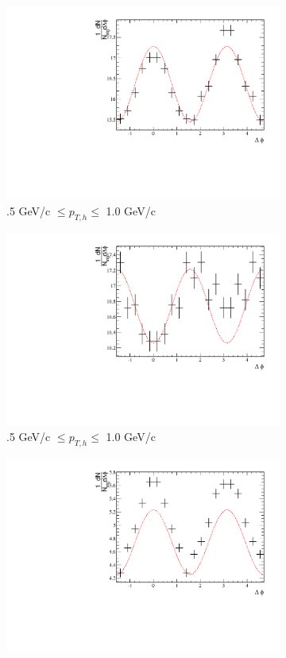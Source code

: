 \begin{figure}[htbp]
	\begin{subfigure}{0.5\textwidth}
		\includegraphics[width=.9\textwidth]{Plots/Correlations/EP/raw/NPE_eh_corr_raw_inplane_primpt_4_5_cent_2_5_assopt_1_1.pdf}
		\caption{.5 GeV/c $\leq p_{T,h} \leq$ 1.0 GeV/c}
		\label{fig:EP_corr_raw_a}
	\end{subfigure}	
	\begin{subfigure}{0.5\textwidth}
		\includegraphics[width=.9\textwidth]{Plots/Correlations/EP/raw/NPE_eh_corr_raw_outofplane_primpt_4_5_cent_2_5_assopt_1_1.pdf}
		\caption{.5 GeV/c $\leq p_{T,h} \leq$ 1.0 GeV/c}
		\label{fig:EP_corr_raw_b}
	\end{subfigure}	
	\begin{subfigure}{0.5\textwidth}
		\includegraphics[width=.9\textwidth]{Plots/Correlations/EP/raw/NPE_eh_corr_raw_inplane_primpt_4_5_cent_2_5_assopt_2_2.pdf}

\end{subfigure}
\end{figure}
